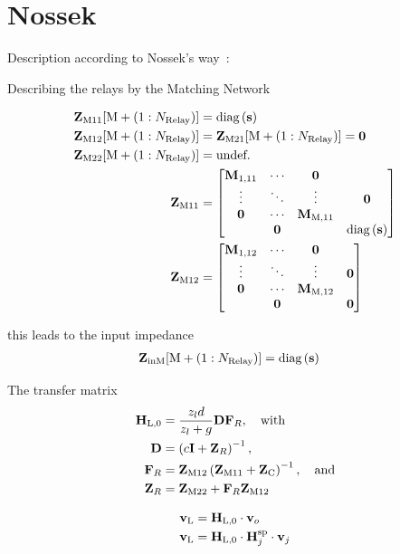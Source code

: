\chapter{Nossek}
\label{sec:nossek}


Description according to Nossek's way~\cite{Nossek}:

Describing the relays by the Matching Network

\begin{align}
\label{eq:nossek_matching}
\mathbf{Z}_\text{M11}[\text{M}+\left(1:N_\text{Relay}\right)] &= \text{diag}\left(\mathbf{s}\right)\\
\mathbf{Z}_\text{M12}[\text{M}+\left(1:N_\text{Relay}\right)] &= 
	\mathbf{Z}_\text{M21}[\text{M}+\left(1:N_\text{Relay}\right)] = \mathbf{0}\\
\mathbf{Z}_\text{M22}[\text{M}+\left(1:N_\text{Relay}\right)] &= \text{undef.}\\
\mathbf{Z}_\text{M11} &=
\begin{bmatrix}
\mathbf{M}_\text{1,11} & \cdots & \mathbf{0}&\\
 \vdots & \ddots & \vdots & \mathbf{0}\\
 \mathbf{0}& \cdots & \mathbf{M}_\text{M,11}&\\
 & \mathbf{0}& & \text{diag}\left(\mathbf{s}\right)
\end{bmatrix}\\
\mathbf{Z}_\text{M12}&=
\begin{bmatrix}
\mathbf{M}_\text{1,12} & \cdots& \mathbf{0}&\\
\vdots & \ddots & \vdots & \mathbf{0}\\
\mathbf{0} & \cdots & \mathbf{M}_\text{M,12}&\\
& \mathbf{0} &	& \mathbf{0}
\end{bmatrix}
\end{align}

this leads to the input impedance
\begin{align}
\label{eq:nossek_matching}
\mathbf{Z}_\text{inM}[\text{M}+\left(1:N_\text{Relay}\right)] &= \text{diag}\left(\mathbf{s}\right)
\end{align}



The transfer matrix
\begin{align}
\label{eq:nossek_transf}
\mathbf{H}_\text{L,0} &= \frac{z_l d}{z_l + g}\mathbf{D}\mathbf{F}_R,\quad\text{with}\\
\mathbf{D} &= \left(c\mathbf{I} + \mathbf{Z}_R\right)^{-1},\\
\mathbf{F}_R &= \mathbf{Z}_\text{M12}\left(\mathbf{Z}_\text{M11}+\mathbf{Z}_\text{C}\right)^{-1},\quad\text{and}\\
\mathbf{Z}_R &= \mathbf{Z}_\text{M22} + \mathbf{F}_R\mathbf{Z}_\text{M12}
\end{align}

\begin{align}
\mathbf{v}_\text{L} &= \mathbf{H}_\text{L,0}\cdot\mathbf{v}_o\\
\mathbf{v}_\text{L} &= \mathbf{H}_\text{L,0}\cdot\mathbf{H}_{j}^{\text{sp}}\cdot\mathbf{v}_j
\end{align}

